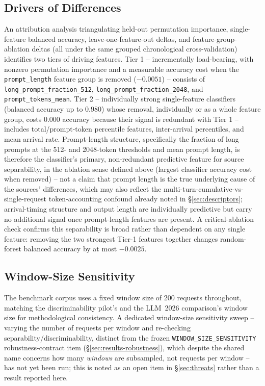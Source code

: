 \subsection{Drivers of Differences}
\label{sec:drivers}

An attribution analysis triangulating held-out permutation importance,
single-feature balanced accuracy, leave-one-feature-out deltas, and
feature-group-ablation deltas (all under the same grouped chronological
cross-validation) identifies two tiers of driving features. Tier 1 --
incrementally load-bearing, with nonzero permutation importance and a
measurable accuracy cost when the \texttt{prompt\_length} feature group is
removed ($-0.0051$) -- consists of \texttt{long\_prompt\_fraction\_512},
\texttt{long\_prompt\_fraction\_2048}, and \texttt{prompt\_tokens\_mean}.
Tier 2 -- individually strong single-feature classifiers (balanced accuracy
up to $0.980$) whose removal, individually or as a whole feature group,
costs $0.000$ accuracy because their signal is redundant with Tier 1 --
includes total/prompt-token percentile features, inter-arrival percentiles,
and mean arrival rate. Prompt-length structure, specifically the fraction
of long prompts at the 512- and 2048-token thresholds and mean prompt
length, is therefore the classifier's primary, non-redundant predictive
feature for source separability, in the ablation sense defined above
(largest classifier accuracy cost when removed) -- not
a claim that prompt length is the true underlying cause of the sources'
differences, which may also reflect the multi-turn-cumulative-vs-single-request
token-accounting confound already noted in \S\ref{sec:descriptors};
arrival-timing structure and output length are individually
predictive but carry no additional signal once prompt-length features are
present. A critical-ablation check confirms this separability is broad
rather than dependent on any single feature: removing the two strongest
Tier-1 features together changes random-forest balanced accuracy by at
most $-0.0025$.

\subsection{Window-Size Sensitivity}
\label{sec:window-size}

The benchmark corpus uses a fixed window size of 200 requests throughout,
matching the discriminability pilot's and the LLM~2026 comparison's window
size for methodological consistency. A dedicated window-size sensitivity sweep --
varying the number of requests per window and re-checking
separability/discriminability, distinct from the frozen
\texttt{WINDOW\_SIZE\_SENSITIVITY} robustness-contract item
(\S\ref{sec:results-robustness}), which despite the shared name concerns
how many \emph{windows} are subsampled, not requests per window -- has not
yet been run; this is noted as an open item in \S\ref{sec:threats} rather
than a result reported here.
